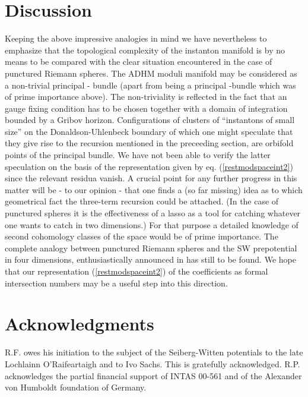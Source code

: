 \documentclass[a4paper,12pt]{article}
\begin{document}
\section{Discussion}

Keeping the above impressive analogies in mind we have nevertheless 
to emphasize that the topological complexity of the instanton 
manifold is by no means to be compared with the clear situation 
encountered in the case of punctured Riemann spheres. The 
ADHM moduli manifold may be considered as a non-trivial 
principal \coordHE{}- bundle  
(apart from being  a principal \coordHE{}-bundle which was of prime 
importance above). The 
non-triviality is reflected in the fact that an \coordHE{} gauge 
fixing condition has to be chosen together with a domain of  
integration bounded by a Gribov horizon. Configurations of clusters 
of ``instantons of small size'' on the Donaldson-Uhlenbeck boundary 
of which one might speculate that they give rise to the recursion 
mentioned in the preceeding section, are orbifold points of the 
\coordHE{} principal bundle. We have not been able to verify the 
latter speculation on the basis of the representation given 
by eq. (\ref{restmodspaceint2}) since the relevant residua vanish. 
A crucial 
point for any further progress in this matter will be - to our 
opinion - that one finds a (so far missing) idea as to which geometrical 
fact the three-term recursion could be attached. (In the case 
of punctured spheres it is the effectiveness of a lasso as 
a tool for catching whatever one wants to catch in two dimensions.)
For that purpose a detailed knowledge of second cohomology classes 
\coordHE{} of the space \coordHE{} would be of prime importance. 
The complete analogy between punctured Riemann spheres and 
the SW prepotential in four dimensions, enthusiastically announced 
in \cite{matone2} has still to be found. We hope that our 
representation (\ref{restmodspaceint2}) of the coefficients 
\coordHE{} as formal 
intersection numbers may be a useful step into this direction.    



\section*{Acknowledgments}
R.F. owes his initiation to the subject of the Seiberg-Witten 
potentials to the late Lochlainn O'Raifeartaigh and to Ivo Sachs. 
This is gratefully  acknowledged.
R.P. acknowledges the partial financial support of INTAS 00-561 
and of the Alexander von Humboldt foundation of Germany.
\end{document}
